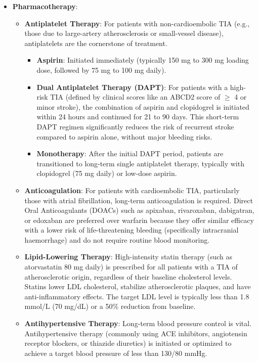 \begin{itemize}
    \item \textbf{Pharmacotherapy}:
    \begin{itemize}
        \item \textbf{Antiplatelet Therapy}: For patients with non-cardioembolic TIA (e.g., those due to large-artery atherosclerosis or small-vessel disease), antiplatelets are the cornerstone of treatment.
        \begin{itemize}
            \item \textbf{Aspirin}: Initiated immediately (typically 150 mg to 300 mg loading dose, followed by 75 mg to 100 mg daily).
            \item \textbf{Dual Antiplatelet Therapy (DAPT)}: For patients with a high-risk TIA (defined by clinical scores like an ABCD2 score of $\ge$ 4 or minor stroke), the combination of aspirin and clopidogrel is initiated within 24 hours and continued for 21 to 90 days. This short-term DAPT regimen significantly reduces the risk of recurrent stroke compared to aspirin alone, without major bleeding risks.
            \item \textbf{Monotherapy}: After the initial DAPT period, patients are transitioned to long-term single antiplatelet therapy, typically with clopidogrel (75 mg daily) or low-dose aspirin.
        \end{itemize}
        \item \textbf{Anticoagulation}: For patients with cardioembolic TIA, particularly those with atrial fibrillation, long-term anticoagulation is required. Direct Oral Anticoagulants (DOACs) such as apixaban, rivaroxaban, dabigatran, or edoxaban are preferred over warfarin because they offer similar efficacy with a lower risk of life-threatening bleeding (specifically intracranial haemorrhage) and do not require routine blood monitoring.
        \item \textbf{Lipid-Lowering Therapy}: High-intensity statin therapy (such as atorvastatin 80 mg daily) is prescribed for all patients with a TIA of atherosclerotic origin, regardless of their baseline cholesterol levels. Statins lower LDL cholesterol, stabilize atherosclerotic plaques, and have anti-inflammatory effects. The target LDL level is typically less than 1.8 mmol/L (70 mg/dL) or a 50\% reduction from baseline.
        \item \textbf{Antihypertensive Therapy}: Long-term blood pressure control is vital. Antihypertensive therapy (commonly using ACE inhibitors, angiotensin receptor blockers, or thiazide diuretics) is initiated or optimized to achieve a target blood pressure of less than 130/80 mmHg.
    \end{itemize}


\end{itemize}
